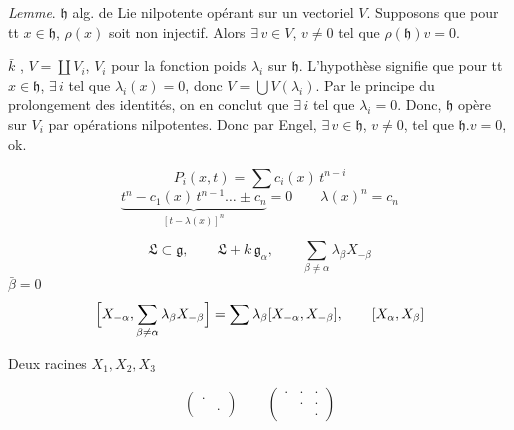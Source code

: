 \documentclass[11pt,a4paper]{article}
\begin{document}
\emph{Lemme}. $\mathfrak{h}$ alg. de Lie nilpotente  opérant sur un vectoriel $V$. Supposons que pour tt
$x \in \mathfrak{h}$, $\rho(x)$ soit non injectif. Alors $\exists\, v \in V$,
$v \neq 0$ tel que $\rho(\mathfrak{h}) v = 0$.

$\bar k$ , $V = \coprod V_i$, $V_i$ 
 pour la fonction poids $\lambda_i$ sur $\mathfrak{h}$.
L'hypothèse signifie que pour tt $x \in \mathfrak{h}$, $\exists\, i$ tel que
$\lambda_i(x) = 0$, donc $V = \bigcup V(\lambda_i)$. Par le principe du
prolongement des identités, on en conclut que $\exists\, i$ tel que
$\lambda_i = 0$. Donc, $\mathfrak{h}$ opère sur $V_i$ \struck{\ill{}} par
opérations nilpotentes. Donc \struck{\ill{} \ill{}} par Engel,
$\exists\, v \in \mathfrak{h}$, $v \neq 0$, tel que
$\mathfrak{h} . v = 0$, ok.

\[
  P_i(x, t) = \sum c_i(x)\, t^{n-i}
\]
\[
  \underbrace{t^{n} - c_1(x)\, t^{n-1} \ldots \pm c_n}_{[t - \lambda(x)]^{n}} = 0
  \qquad \lambda(x)^{n} = c_n
\]



\[
  \mathfrak{L} \subset \mathfrak{g}, \qquad \mathfrak{L} + k\,
  \mathfrak{g}_{\alpha}, \qquad \sum_{\beta \neq \alpha} \lambda_{\beta}
  X_{-\beta}
\]
\struck{\ill{}} \quad $\bar\beta = 0$
\[
  \Bigl[ X_{-\alpha}, \sum_{\beta \neq \alpha} \lambda_{\beta} X_{-\beta}
  \Bigr] = \sum \lambda_{\beta} [X_{-\alpha}, X_{-\beta}], \qquad
  [X_{\alpha}, X_{\beta}]
\]

Deux racines \qquad $X_1, X_2, X_3$

\[
  \begin{pmatrix} \cdot & \\ & \cdot \end{pmatrix} \qquad
  \begin{pmatrix} \cdot & \cdot & \cdot \\ & \cdot & \cdot \\ & & \cdot \end{pmatrix}
\]
\end{document}
